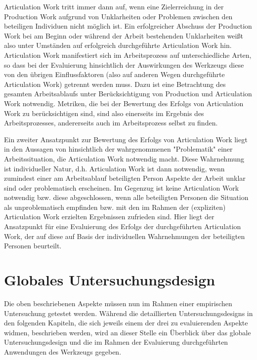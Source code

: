 Articulation Work tritt immer dann auf, wenn eine Zielerreichung in der Production Work aufgrund von Unklarheiten oder Problemen zwischen den beteiligen Individuen nicht möglich ist. Ein erfolgreicher Abschuss der Production Work bei am Beginn oder während der Arbeit bestehenden Unklarheiten weißt also unter Umständen auf erfolgreich durchgeführte Articulation Work hin. Articulation Work manifestiert sich im Arbeitsprozess auf unterschiedliche Arten, so dass bei der Evaluierung hinsichtlich der Auswirkungen des Werkzeugs diese von den übrigen Einflussfaktoren (also auf anderen Wegen durchgeführte Articulation Work) getrennt werden muss. Dazu ist eine Betrachtung des gesamten Arbeitsablaufs unter Berücksichtigung von Production und Articulation Work notwendig. Metriken, die bei der Bewertung des Erfolgs von Articulation Work zu berücksichtigen sind, sind also einerseits im Ergebnis des Arbeitsprozesses, andererseits auch im Arbeitsprozess selbst zu finden.

Ein zweiter Ansatzpunkt zur Bewertung des Erfolgs von Articulation Work liegt in den Aussagen von \citet{Strauss93} hinsichtlich der wahrgenommenen "Problematik" einer Arbeitssituation, die Articulation Work notwendig macht. Diese Wahrnehmung ist individueller Natur, d.h. Articulation Work ist dann notwendig, wenn zumindest einer am Arbeitsablauf beteiligten Person Aspekte der Arbeit unklar sind oder problematisch erscheinen. Im Gegenzug ist keine Articulation Work notwendig bzw. diese abgeschlossen, wenn alle beteiligten Personen die Situation als unproblematisch empfinden bzw. mit den im Rahmen der (expliziten) Articulation Work erzielten Ergebnissen zufrieden sind. Hier liegt der Ansatzpunkt für eine Evaluierung des Erfolgs der durchgeführten Articulation Work, der auf diese auf Basis der individuellen Wahrnehmungen der beteiligten Personen beurteilt.

\section{Globales Untersuchungsdesign}
\label{sec:globales_untersuchungsdesign}

Die oben beschriebenen Aspekte müssen nun im Rahmen einer empirischen Untersuchung getestet werden. Während die detaillierten Untersuchungsdesigns in den folgenden Kapiteln, die sich jeweils einem der drei zu evaluierenden Aspekte widmen, beschrieben werden, wird an dieser Stelle ein Überblick über das globale Untersuchungsdesign und die im Rahmen der Evaluierung durchgeführten Anwendungen des Werkzeugs gegeben.

